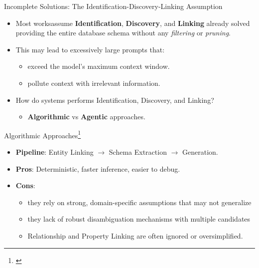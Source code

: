\documentclass[aspectratio=169]{beamer}
\begin{document}
\begin{frame}{Incomplete Solutions: The Identification-Discovery-Linking Assumption}
  \begin{itemize}
    \item Most works\footnotemark assume \textbf{Identification}, \textbf{Discovery}, and \textbf{Linking} already solved providing the entire database schema without any \textit{filtering} or \textit{pruning}.

    \item This may lead to excessively large prompts that:
    \begin{itemize}
      \item exceed the model's maximum context window.
      \item pollute context with irrelevant information.
    \end{itemize}

    \item How do systems performs Identification, Discovery, and Linking?
    \begin{itemize}
      \item \textbf{Algorithmic} vs \textbf{Agentic} approaches.
    \end{itemize}
  \end{itemize}
\end{frame}

\begin{frame}{Algorithmic Approaches\footnote{\cite{yang-etal-2026-enhancing}}}
  \begin{itemize}
    \item \textbf{Pipeline}: Entity Linking $\rightarrow$ Schema Extraction $\rightarrow$ Generation.
    \item \textbf{Pros}: Deterministic, faster inference, easier to debug.
    \item \textbf{Cons}:
    \begin{itemize}
      \item they rely on strong, domain-specific assumptions that may not generalize
      \item they lack of robust disambiguation mechanisms with multiple candidates
      \item Relationship and Property Linking are often ignored or oversimplified.
    \end{itemize}
  \end{itemize}
\end{frame}
\end{document}
